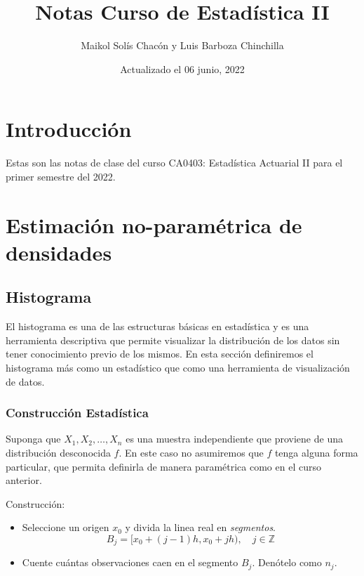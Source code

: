 \documentclass[
  12pt,
]{book}
\title{Notas Curso de Estadística II}
\author{Maikol Solís Chacón y Luis Barboza Chinchilla}
\date{Actualizado el 06 junio, 2022}
\begin{document}
\frontmatter
\maketitle

\mainmatter
\hypertarget{introducciuxf3n}{%
\chapter{Introducción}\label{introducciuxf3n}}

Estas son las notas de clase del curso CA0403: Estadística Actuarial II
para el primer semestre del 2022.

\hypertarget{estimaciuxf3n-no-paramuxe9trica-de-densidades}{%
\chapter{Estimación no-paramétrica de
densidades}\label{estimaciuxf3n-no-paramuxe9trica-de-densidades}}

\hypertarget{histograma}{%
\section{Histograma}\label{histograma}}

El histograma es una de las estructuras básicas en estadística y es una
herramienta descriptiva que permite visualizar la distribución de los
datos sin tener conocimiento previo de los mismos. En esta sección
definiremos el histograma más como un estadístico que como una
herramienta de visualización de datos.

\hypertarget{construcciuxf3n-estaduxedstica}{%
\subsection{Construcción
Estadística}\label{construcciuxf3n-estaduxedstica}}

Suponga que \(X_1,X_2, \dots ,X_n\) es una muestra independiente que
proviene de una distribución desconocida \(f\). En este caso no
asumiremos que \(f\) tenga alguna forma particular, que permita
definirla de manera paramétrica como en el curso anterior.

Construcción:

\begin{itemize}
\item
  Seleccione un origen \(x_0\) y divida la linea real en
  \emph{segmentos}. \begin{equation*}
  B_j = [x_0 +(j - 1)h,x_0 + jh), \quad j\in \mathbb{Z}
  \end{equation*}
\item
  Cuente cuántas observaciones caen en el segmento \(B_j\). Denótelo
  como \(n_j\).
\end{itemize}
\end{document}
